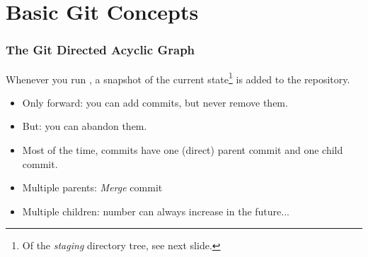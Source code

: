 \section{Basic Git Concepts}


\begin{frame}
  \frametitle{The Git Directed Acyclic Graph}

  Whenever you run , a snapshot of the current
  state\footnote{Of the \emph{staging} directory tree, see next
    slide.} is added to the repository.
  \begin{itemize}
  \item Only forward: you can add commits, but never remove them.
  \item But: you can abandon them.
  \item Most of the time, commits have one (direct) parent commit and
    one child commit.
  \item Multiple parents: \emph{Merge} commit
  \item Multiple children: number can always increase in the future...
  \end{itemize}
\end{frame}


{
  \begin{frame}[plain]
  \end{frame}
}


